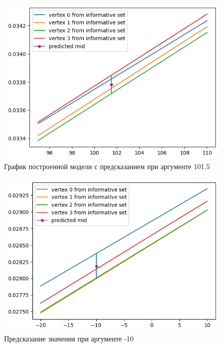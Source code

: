\documentclass[12pt,a4paper]{article}
\begin{document}
\begin{figure}[H]
    \centering
    \includegraphics[width=14cm]{4_4.png}
    \caption{График построенной модели с предсказанием при аргументе 101.5}
    \label{fig:info}
\end{figure}

\begin{figure}[H]
    \centering
    \includegraphics[width=14cm]{4_5.png}
    \caption{Предсказание значения при аргументе -10}
    \label{fig:info}
\end{figure}
\end{document}
